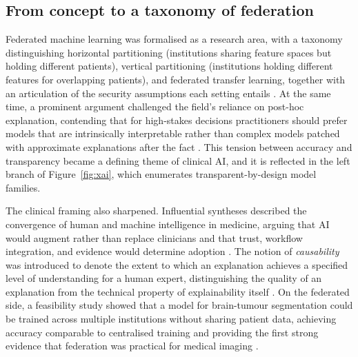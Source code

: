 \documentclass[11pt,a4paper]{article}
\begin{document}
\subsection{From concept to a taxonomy of federation}
Federated machine learning was formalised as a research area, with a taxonomy
distinguishing horizontal partitioning (institutions sharing feature spaces but
holding different patients), vertical partitioning (institutions holding
different features for overlapping patients), and federated transfer learning,
together with an articulation of the security assumptions each setting entails
\cite{ref15}. At the same time, a prominent argument challenged the field's
reliance on post-hoc explanation, contending that for high-stakes decisions
practitioners should prefer models that are intrinsically interpretable rather
than complex models patched with approximate explanations after the fact
\cite{ref16}. This tension between accuracy and transparency became a defining
theme of clinical AI, and it is reflected in the left branch of
Figure~\ref{fig:xai}, which enumerates transparent-by-design model families.

The clinical framing also sharpened. Influential syntheses described the
convergence of human and machine intelligence in medicine, arguing that AI would
augment rather than replace clinicians and that trust, workflow integration, and
evidence would determine adoption \cite{ref17}. The notion of \emph{causability}
was introduced to denote the extent to which an explanation achieves a specified
level of understanding for a human expert, distinguishing the quality of an
explanation from the technical property of explainability itself \cite{ref18}.
On the federated side, a feasibility study showed that a model for brain-tumour
segmentation could be trained across multiple institutions without sharing
patient data, achieving accuracy comparable to centralised training and
providing the first strong evidence that federation was practical for medical
imaging \cite{ref19}.
\end{document}
